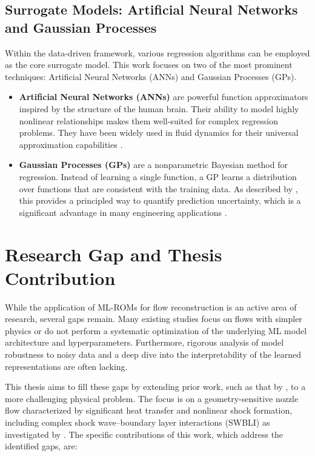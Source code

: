 \documentclass[dscexam, EN]{ufabcFHZh}
\begin{document}
\subsection{Surrogate Models: Artificial Neural Networks and Gaussian Processes}

Within the data-driven framework, various regression algorithms can be employed as the core surrogate model. This work focuses on two of the most prominent techniques: Artificial Neural Networks (ANNs) and Gaussian Processes (GPs).

\begin{itemize}
    \item \textbf{Artificial Neural Networks (ANNs)} are powerful function approximators inspired by the structure of the human brain. Their ability to model highly nonlinear relationships makes them well-suited for complex regression problems. They have been widely used in fluid dynamics for their universal approximation capabilities \citep{Berner2022, Czum2020, Kumar2020}.

    \item \textbf{Gaussian Processes (GPs)} are a nonparametric Bayesian method for regression. Instead of learning a single function, a GP learns a distribution over functions that are consistent with the training data. As described by \citet{rasmussenGaussian2006}, this provides a principled way to quantify prediction uncertainty, which is a significant advantage in many engineering applications \citep{Liu2020, Hasdiana2018a}.
\end{itemize}

\section{Research Gap and Thesis Contribution}

While the application of ML-ROMs for flow reconstruction is an active area of research, several gaps remain. Many existing studies focus on flows with simpler physics or do not perform a systematic optimization of the underlying ML model architecture and hyperparameters. Furthermore, rigorous analysis of model robustness to noisy data and a deep dive into the interpretability of the learned representations are often lacking.

This thesis aims to fill these gaps by extending prior work, such as that by \citet{Yu2019}, to a more challenging physical problem. The focus is on a geometry-sensitive nozzle flow characterized by significant heat transfer and nonlinear shock formation, including complex shock wave–boundary layer interactions (SWBLI) as investigated by \citet{martelliFlow2020}. The specific contributions of this work, which address the identified gaps, are:
\end{document}
